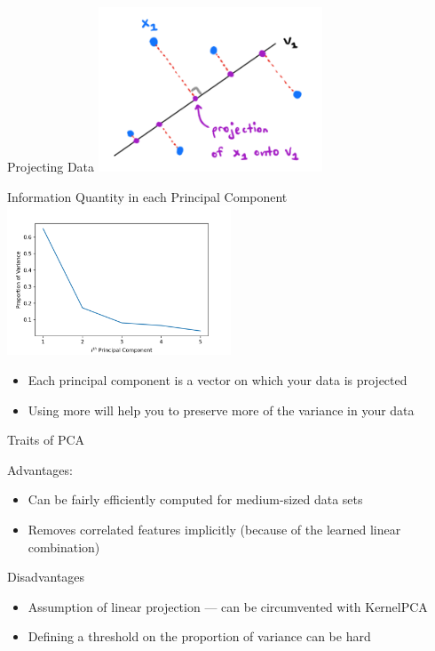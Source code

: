 \documentclass[aspectratio=169]{../latex_main/tntbeamer}  %
\begin{document}
	\begin{frame}{Projecting Data}
        \centering
        \includegraphics[width=0.5\textwidth]{Bild9.PNG}
	\end{frame}
	
	\begin{frame}{Information Quantity in each Principal Component}
        \centering
        \includegraphics[width=0.5\textwidth]{Bild13.PNG}
        
        \begin{itemize}
            \item Each principal component is a vector on which your data is projected
            \item Using more will help you to preserve more of the variance in your data
        \end{itemize}
        
	\end{frame}
	
	\begin{frame}{Traits of PCA}

    Advantages:
    \begin{itemize}
        \item Can be fairly efficiently computed for medium-sized data sets
        \item Removes correlated features implicitly (because of the learned linear combination)
    \end{itemize}
    
    Disadvantages
    \begin{itemize}
        \item Assumption of linear projection --- can be circumvented with KernelPCA
        \item Defining a threshold on the proportion of variance can be hard
    \end{itemize}


	\end{frame}
	
	
\end{document}
